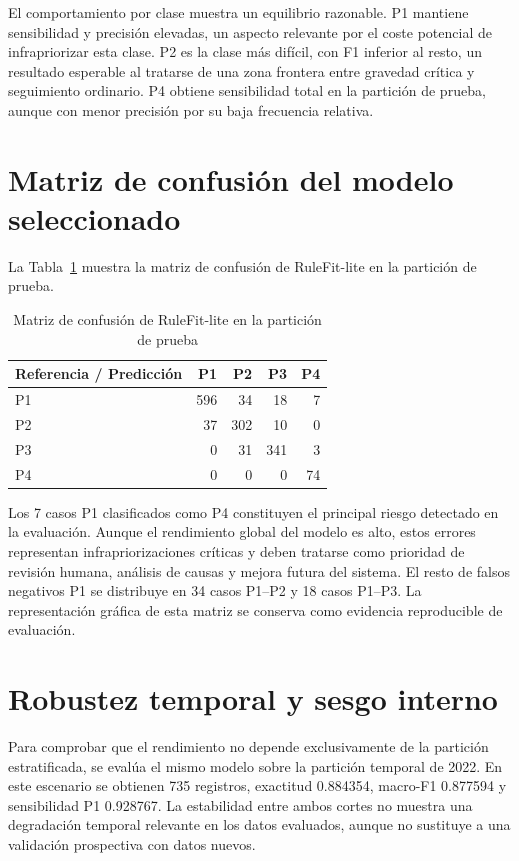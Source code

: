 El comportamiento por clase muestra un equilibrio razonable. P1 mantiene sensibilidad
y precisión elevadas, un aspecto relevante por el coste potencial de infrapriorizar esta clase. P2 es la
clase más difícil, con F1 inferior al resto, un resultado esperable al tratarse de una
zona frontera entre gravedad crítica y seguimiento ordinario. P4 obtiene sensibilidad total
en la partición de prueba, aunque con menor precisión por su baja frecuencia relativa.

\section{Matriz de confusión del modelo seleccionado}

La Tabla~\ref{tab:9-confusion-rulefit-lite} muestra la matriz de confusión de
RuleFit-lite en la partición de prueba.

\begin{table}[ht]
\centering
\caption{Matriz de confusión de RuleFit-lite en la partición de prueba}
\label{tab:9-confusion-rulefit-lite}
\small
\begin{tabular}{|l|r|r|r|r|}
\hline
\textbf{Referencia / Predicción} & \textbf{P1} & \textbf{P2} & \textbf{P3} & \textbf{P4} \\ \hline
P1 & 596 & 34 & 18 & 7 \\ \hline
P2 & 37 & 302 & 10 & 0 \\ \hline
P3 & 0 & 31 & 341 & 3 \\ \hline
P4 & 0 & 0 & 0 & 74 \\ \hline
\end{tabular}
\end{table}

Los 7 casos P1 clasificados como P4 constituyen el principal riesgo detectado en la
evaluación. Aunque el rendimiento global del modelo es alto, estos errores representan
infrapriorizaciones críticas y deben tratarse como prioridad de revisión humana,
análisis de causas y mejora futura del sistema. El resto de falsos negativos P1 se
distribuye en 34 casos P1--P2 y 18 casos P1--P3. La representación gráfica de esta matriz se conserva como evidencia reproducible de evaluación.

\section{Robustez temporal y sesgo interno}

Para comprobar que el rendimiento no depende exclusivamente de la partición estratificada, se
evalúa el mismo modelo sobre la partición temporal de 2022. En este escenario se obtienen
735 registros, exactitud 0.884354, macro-F1 0.877594 y sensibilidad P1 0.928767. La estabilidad
entre ambos cortes no muestra una degradación temporal relevante en los datos evaluados,
aunque no sustituye a una validación prospectiva con datos nuevos.


